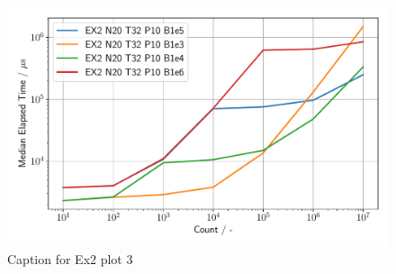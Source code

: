\begin{figure}[h]
    \begin{center}
        \includegraphics[width=1.0\linewidth]{figures/Ex2_3.pdf}
        \caption{Caption for Ex2 plot 3}
        \label{Ex2_3_p}
    \end{center}
\end{figure}



